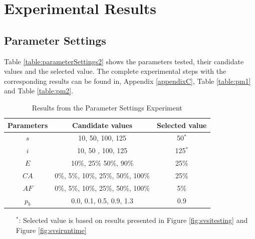 \section{Experimental Results}
\label{sec:expResults}

\subsection{Parameter Settings}
\label{subsec:parameterSettings_results}

Table \vref{table:parameterSettings2} shows the parameters tested, their candidate values and the selected value. The complete experimental steps with the corresponding results can be found in, Appendix \ref{appendixC}, Table \vref{table:pm1} and Table \vref{table:pm2}. 

    \begin{table}[H]
    \centering
    \begin{tabular}{|c|c||c|}
    \hline
    Parameters & Candidate values & Selected value\\
    \hline
    $s$ & 10, 50, 100, 125 & 50$^*$ \\
    $i$ & 10, 50 , 100, 125 & 125$^*$ \\
    $E$ & 10\%, 25\% 50\%, 90\% & 25\% \\
    $CA$ & 0\%, 5\%, 10\%, 25\%, 50\%, 100\% & 25\% \\
    $AF$ & 0\%, 5\%, 10\%, 25\%, 50\%, 100\% & 5\% \\
    $p_{b}$ & 0.0, 0.1, 0.5, 0.9, 1.3 & 0.9 \\
    \hline
    \end{tabular}
    \caption {Results from the Parameter Settings Experiment}
    \begin{itemize}[noitemsep]
    \item[$^*$:]  Selected value is based on results presented in Figure \vref{fig:svsitesting} and Figure \vref{fig:svsiruntime} 
    \end{itemize}
    \label{table:parameterSettings2}
    \end{table}
    
